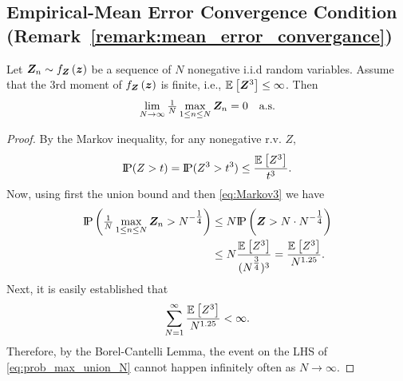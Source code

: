 \subsection{%
Empirical-Mean Error Convergence Condition (Remark~\ref{remark:mean_error_convergance})}\label{apx:remark_convergance_proof}


\begin{prop}
    \label{prop:nonneg_z}
    Let $\randomvec{Z}_n\sim\probt{\z}{\Z}$ be a sequence of $N$ nonegative {i.i.d} random variables. Assume that the 3rd moment  {of $\probt{\z}{\Z}$} is finite, i.e.,
    ${\expectation{\randomvec{Z}^3}{}}\leq \infty$.  Then
     {
     \begin{equation*}
       \lim\limits_{N \rightarrow \infty } 
       \tfrac{1}{N} \max\limits_{1\leq n\leq N} \randomvec{Z}_n
       = 0 \quad \text{a.s.}
    \end{equation*}
    }
\end{prop}
\begin{proof}
By 
the Markov inequality, for any nonegative r.v.
$Z$,
\begin{equation} \label{eq:Markov3}
\text{I\kern-0.15em P}(Z > t) = \text{I\kern-0.15em P}(Z^3 > t^3) \leq \frac{\mathbb{E}_{}\left[Z^3\right]}{t^3}.
\end{equation}
Now, {using first} the union bound {and then \eqref{eq:Markov3} we have}
{
\begin{align}\label{eq:prob_max_union_N}
    \probP\brackets{
   \tfrac{1}{N} \max\limits_{1\leq n\leq N} \randomvec{Z}_n
    >N^{-\tfrac{1}{4}}}
    &\leq N \probP\brackets{\randomvec{Z}>N \cdot N^{-\tfrac{1}{4}}
    } 
     \nonumber\\
      &\leq N \frac{\expectation{Z^3}{}}{(N^{\tfrac{3}{4}})^3 }
          = \frac{\expectation{Z^3}{}}{N^{1.25}}.
\end{align}
}
Next, it is easily established that 
$$ \sum_{N=1}^\infty \frac{\mathbb{E}_{}\left[Z^3\right]}{N^{1.25}} < \infty .$$
Therefore, by the Borel-Cantelli Lemma, the event on the LHS of \eqref{eq:prob_max_union_N} cannot happen infinitely often as $N\rightarrow \infty$.
\end{proof}

